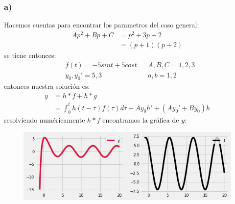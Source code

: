 \documentclass{article}
\begin{document}
\begin{tcolorbox}[breakable]
    \subsubsection*{a)}
    Hacemos cuentas para encontrar los parametros del caso general:
    \begin{align*}
        Ap^2 + Bp + C 
        &= p^2 + 3p + 2 \\
        &= (p+1)(p+2) 
    \end{align*}
    se tiene entonces:
    \begin{align*}
        &f(t) = -5sint + 5cost
        &&A, B, C = 1, 2, 3 \\ 
        &y_0, y_0' = 5, 3 
        &&a, b = 1, 2 
    \end{align*}
    entonces nuestra solución es:
    \begin{align*}
        y 
        &= h*f + h*g \\
        &= \int_{0}^t h(t-\tau)f(\tau)d\tau  + Ay_0h' + (Ay_0'+By_0)h 
    \end{align*}
    resolviendo numéricamente $h*f$ encontramos la gráfica de $y$:
    \begin{figure}[H]
        \centering
        \includegraphics[scale=0.7]{images/p1_1.png}
    \end{figure}


\end{tcolorbox}
\end{document}

